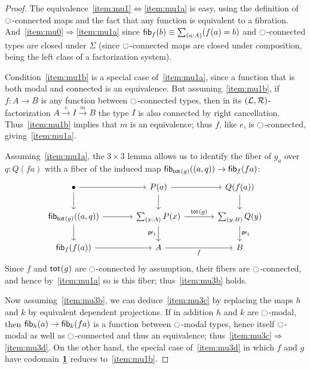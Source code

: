 \begin{proof}
  The equivalence~\ref{item:mu1}$\Leftrightarrow$\ref{item:mu1a} is easy, using the definition of ${\ocircle}$-connected maps and the fact that any function is equivalent to a fibration.
  And~\ref{item:mu0}$\Rightarrow$\ref{item:mu1a} since $\fib f b \jdeq \sm{a:A} (f(a)=b)$ and ${\ocircle}$-connected types are closed under $\Sigma$ (since ${\ocircle}$-connected maps are closed under composition, being the left class of a factorization system).

  Condition~\ref{item:mu1b} is a special case of~\ref{item:mu1a}, since a function that is both modal and connected is an equivalence.
  But assuming~\ref{item:mu1b}, if $f:A\to B$ is any function between ${\ocircle}$-connected types, then in its $(\mathcal{L},\mathcal{R})$-factorization $A\xrightarrow{e} I\xrightarrow{m} B$ the type $I$ is also connected by right cancellation.
  Thus~\ref{item:mu1b} implies that $m$ is an equivalence; thus $f$, like $e$, is ${\ocircle}$-connected, giving~\ref{item:mu1a}.

  Assuming~\ref{item:mu1a}, the $3\times 3$ lemma allows us to identify the fiber of $g_a$ over $q:Q(fa)$ with a fiber of the induced map $\mathsf{fib}_{\mathsf{tot}_{}(g)}((a,q)) \to \mathsf{fib}_{f}(fa)$:
  \begin{equation}
  \begin{tikzcd}[column sep=large]
  \bullet \arrow[r] \arrow[d] 
    & P(a) \arrow[r] \arrow[d] 
    & Q(f(a)) \arrow[d] \\
  \fib{\total{g}}{(a,q)} \arrow[r] \arrow[d] 
    & \sm{x:A}P(x) \arrow[r,"{\total{g}}"] \arrow[d,swap,"{\proj1}"] 
    & \sm{y:B}Q(y) \arrow[d,"{\proj1}"] \\
  \fib{f}{f(a)} \arrow[r] 
    & A \arrow[r,swap,"f"] 
    & B
  \end{tikzcd}%
  \end{equation}
  Since $f$ and $\mathsf{tot}_{}(g)$ are ${\ocircle}$-connected by assumption, their fibers are ${\ocircle}$-connected, and hence by~\ref{item:mu1a} so is this fiber; thus~\ref{item:mu3b} holds.

  Now assuming~\ref{item:mu3b}, we can deduce~\ref{item:mu3c} by replacing the maps $h$ and $k$ by equivalent dependent projections.
  If in addition $h$ and $k$ are ${\ocircle}$-modal, then $\mathsf{fib}_{h}(a) \to \mathsf{fib}_{k}(fa)$ is a function between ${\ocircle}$-modal types, hence itself ${\ocircle}$-modal as well as ${\ocircle}$-connected and thus an equivalence; thus~\ref{item:mu3c}$\Rightarrow$\ref{item:mu3d}.
  On the other hand, the special case of~\ref{item:mu3d} in which $f$ and $g$ have codomain $\underline{\mathbf{1}}$ reduces to~\ref{item:mu1b}.


\end{proof}
